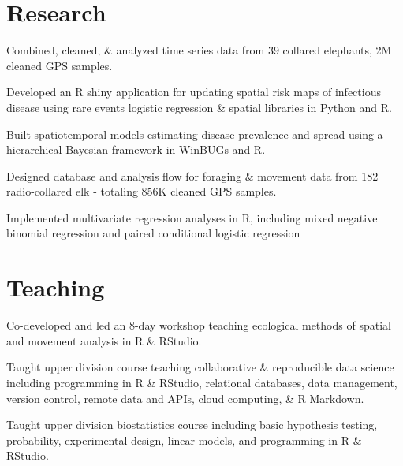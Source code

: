 \documentclass[]{deedy-resume-openfont}
\begin{document}
\begin{minipage}[t]{0.66\textwidth}
\section{Research}
\begin{tightemize}
\item Combined, cleaned, \& analyzed time series data from 39 collared elephants, 2M cleaned GPS samples.
\item Developed an R shiny application for updating spatial risk maps of infectious disease using rare events logistic regression \& spatial libraries in Python and R.
\item Built spatiotemporal models estimating disease prevalence and spread using a hierarchical Bayesian framework in WinBUGs and R.\\
\end{tightemize}
\begin{tightemize}
\item Designed database and analysis flow for foraging \& movement data from 182 radio-collared elk - totaling 856K cleaned GPS samples.
\item Implemented multivariate regression analyses in R, including mixed negative binomial regression and paired conditional logistic regression 
\end{tightemize}
\sectionsep


\section{Teaching}
 
 Co-developed and led an 8-day workshop teaching ecological methods of spatial and movement analysis in R \& RStudio. \href{https://www.danaseidel.com/MovEco-R-Workshop/}{\faGlobe} \href{https://github.com/dpseidel/MovEco-R-Workshop/}{\faGithub} 
\vspace{4pt}

 
 Taught upper division course teaching collaborative \& reproducible data science including programming in R \& RStudio, relational databases, data management, version control, remote data and APIs, cloud computing, \& R Markdown. \href{https://espm-288.carlboettiger.info/}{\faGlobe} \href{https://github.com/ds421}{\faGithub}
\vspace{4pt}

	 
Taught upper division biostatistics course including basic hypothesis testing, probability, experimental design, linear models, and programming in R \& RStudio.
\end{minipage} 
\end{document}
